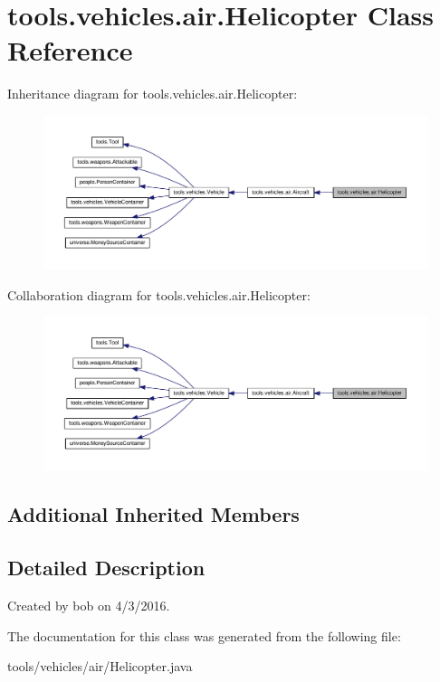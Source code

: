 \hypertarget{classtools_1_1vehicles_1_1air_1_1_helicopter}{}\section{tools.\+vehicles.\+air.\+Helicopter Class Reference}
\label{classtools_1_1vehicles_1_1air_1_1_helicopter}


Inheritance diagram for tools.\+vehicles.\+air.\+Helicopter\+:\nopagebreak
\begin{figure}[H]
\begin{center}
\leavevmode
\includegraphics[width=350pt]{classtools_1_1vehicles_1_1air_1_1_helicopter__inherit__graph}
\end{center}
\end{figure}


Collaboration diagram for tools.\+vehicles.\+air.\+Helicopter\+:\nopagebreak
\begin{figure}[H]
\begin{center}
\leavevmode
\includegraphics[width=350pt]{classtools_1_1vehicles_1_1air_1_1_helicopter__coll__graph}
\end{center}
\end{figure}
\subsection*{Additional Inherited Members}


\subsection{Detailed Description}
Created by bob on 4/3/2016. 

The documentation for this class was generated from the following file\+:\begin{DoxyCompactItemize}
\item 
tools/vehicles/air/Helicopter.\+java\end{DoxyCompactItemize}
